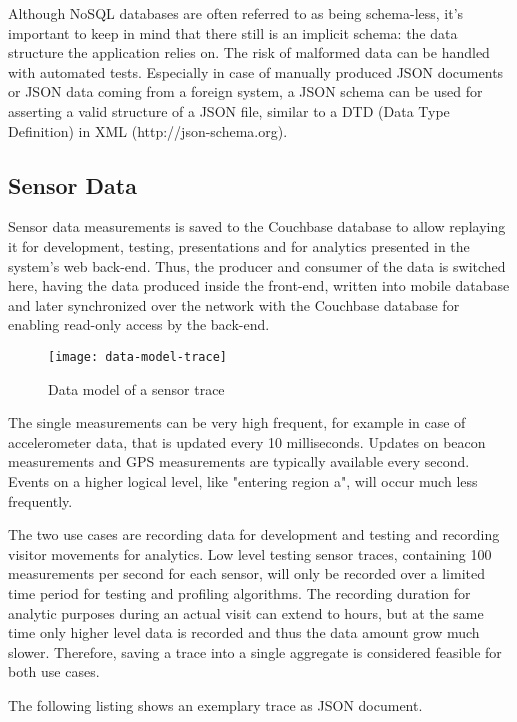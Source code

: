 Although NoSQL databases are often referred to as being schema-less, it's important to keep in mind that there still is an implicit schema: the data structure the application relies on. The risk of malformed data can be handled with automated tests. Especially in case of manually produced JSON documents or JSON data coming from a foreign system, a JSON schema can be used for asserting a valid structure of a JSON file, similar to a DTD (Data Type Definition) in XML (http://json-schema.org).

\subsection{Sensor Data}

Sensor data measurements is saved to the Couchbase database to allow replaying it for development, testing, presentations and for analytics presented in the system's web back-end. Thus, the producer and consumer of the data is switched here, having the data produced inside the front-end, written into mobile database and later synchronized over the network with the Couchbase database for enabling read-only access by the back-end.  

\begin{figure}[H]
\centering
\texttt{[image: data-model-trace]}
\caption{Data model of a sensor trace}
\end{figure}

The single measurements can be very high frequent, for example in case of accelerometer data, that is updated every 10 milliseconds. Updates on beacon measurements and GPS measurements are typically available every second. Events on a higher logical level, like "entering region a", will occur much less frequently.

The two use cases are recording data for development and testing and recording visitor movements for analytics.
Low level testing sensor traces, containing 100 measurements per second for each sensor, will only be recorded over a limited time period for testing and profiling algorithms. 
The recording duration for analytic purposes during an actual visit can extend to hours, but at the same time only higher level data is recorded and thus the data amount grow much slower. Therefore, saving a trace into a single aggregate is considered feasible for both use cases.

The following listing shows an exemplary trace as JSON document.

